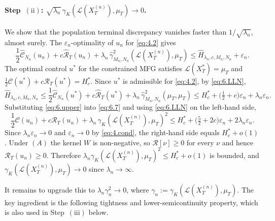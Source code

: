 \documentclass[11pt,leqno]{article}
\theoremstyle{plain}
\theoremstyle{remark}
\theoremstyle{definition}
\numberwithin{equation}{section}
\numberwithin{figure}{section}
\numberwithin{table}{section}
\numberwithin{algorithm}{section}
\begin{document}
\paragraph{Step~$(\mathrm{ii})$: $\sqrt{\lambda_n}\,\gamma_K(\mathcal{L}(X_T^{(n)}),\mu_T)\to 0$.}
We show that the population terminal discrepancy vanishes faster than $1/\sqrt{\lambda_n}$, almost surely.
The $\varepsilon_n$-optimality of $u_n$ for \eqref{eq:4.2} gives
\begin{equation}\label{eq:6.7}
 \frac{1}{2}\hat{\mathcal{C}}_{N_n}(u_n)
 + c\hat{\mathcal{R}}_T(u_n)
 + \lambda_n\,\hat{\gamma}_{M_n,N_n}^2(\mathcal{L}(X_T^{(n)}),\mu_T)
 \le \hat{H}_{\lambda_n,c,M_n,N_n} + \varepsilon_n.
\end{equation}
The optimal control $u^*$ for the constrained MFG satisfies
$\mathcal{L}(X_T^*)=\mu_T$ and $\frac{1}{2}\mathcal{C}(u^*)+c\mathcal{R}_T(u^*)=H^*_c$.
Since $u^*$ is admissible for \eqref{eq:4.2}, by \eqref{eq:6.LLN},
\begin{equation}\label{eq:6.upper}
 \hat{H}_{\lambda_n,c,M_n,N_n}
 \le \frac{1}{2}\hat{\mathcal{C}}_{N_n}(u^*) + c\hat{\mathcal{R}}_T(u^*) + \lambda_n\,\hat{\gamma}_{M_n,N_n}^2(\mu_T,\mu_T)
 \le H^*_c + \bigl(\tfrac{1}{2}+c\bigr)\varepsilon_n + \lambda_n \varepsilon_n.
\end{equation}
Substituting \eqref{eq:6.upper} into \eqref{eq:6.7} and using \eqref{eq:6.LLN} on the left-hand side,
\begin{equation}\label{eq:6.8}
 \frac{1}{2}\mathcal{C}(u_n)
 + c\mathcal{R}_T(u_n)
 + \lambda_n\,\gamma_K(\mathcal{L}(X_T^{(n)}),\mu_T)^2
 \le H^*_c + \bigl(\tfrac{5}{2}+2c\bigr)\varepsilon_n + 2\lambda_n\varepsilon_n.
\end{equation}
Since $\lambda_n\varepsilon_n\to 0$ and $\varepsilon_n\to 0$ by \eqref{eq:4.cond},
the right-hand side equals $H^*_c+o(1)$.
Under $(A)$ the kernel $W$ is non-negative, so $\mathcal{R}[\nu]\ge 0$ for every $\nu$ and hence $\mathcal{R}_T(u_n)\ge 0$.
Therefore $\lambda_n\gamma_K(\mathcal{L}(X_T^{(n)}),\mu_T)^2\le H^*_c+o(1)$ is bounded,
and $\gamma_K(\mathcal{L}(X_T^{(n)}),\mu_T)\to 0$ since $\lambda_n\to\infty$.

It remains to upgrade this to $\lambda_n\gamma_n^2\to 0$, where $\gamma_n:=\gamma_K(\mathcal{L}(X_T^{(n)}),\mu_T)$.
The key ingredient is the following tightness and lower-semicontinuity property,
which is also used in Step~$(\mathrm{iii})$ below.
\end{document}
